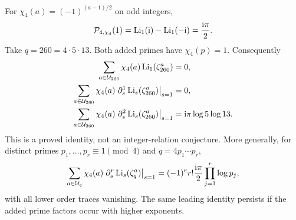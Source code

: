 For $\chi_4(a)=(-1)^{(a-1)/2}$ on odd integers,
\[
\mathcal P_{4,\chi_4}(1)=\operatorname{Li}_1(\mathrm{i})-\operatorname{Li}_1(-\mathrm{i})=\frac{\mathrm{i}\pi}{2}.
\]
Take $q=260=4\cdot5\cdot13$. Both added primes have $\chi_4(p)=1$.
Consequently
\begin{align}\label{conductor:eq:260}
\sum_{a\in\mathcal U_{260}}\chi_4(a)\operatorname{Li}_1(\zeta_{260}^a)&=0,\\
\sum_{a\in\mathcal U_{260}}\chi_4(a)\left.\partial_s^{1}\operatorname{Li}_s(\zeta_{260}^a)\right|_{s=1}&=0,\\
\sum_{a\in\mathcal U_{260}}\chi_4(a)\left.\partial_s^{2}\operatorname{Li}_s(\zeta_{260}^a)\right|_{s=1}
&=\mathrm{i}\pi\log5\log13.
\end{align}
This is a proved identity, not an integer-relation conjecture. More generally,
for distinct primes $p_1,\ldots,p_r\equiv1\pmod4$ and
$q=4p_1\cdots p_r$,
\begin{equation}\label{conductor:eq:chi4family}
\sum_{a\in\mathcal U_q}\chi_4(a)\left.\partial_s^{r}\operatorname{Li}_s(\zeta_q^a)\right|_{s=1}
=(-1)^r r!\frac{\mathrm{i}\pi}{2}\prod_{j=1}^r\log p_j,
\end{equation}
with all lower order traces vanishing. The same leading identity persists
if the added prime factors occur with higher exponents.

